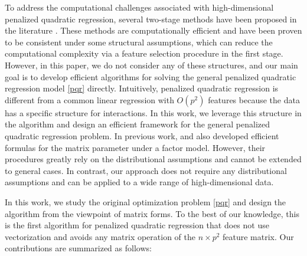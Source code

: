 \documentclass[preprint,authoryear,11pt]{elsarticle}
\begin{document}
To address the computational challenges associated with high-dimensional penalized quadratic regression, several two-stage methods have been proposed in the literature \citep[e.g.,]{hao2014interaction, fan2015innovated, kong2017interaction, hao2016model, yu2019reluctant}. These methods are computationally efficient and have been proven to be consistent under some structural assumptions, which can reduce the computational complexity via a feature selection procedure in the first stage. However, in this paper, we do not consider any of these structures, and our main goal is to develop efficient algorithms for solving the general penalized quadratic regression model \eqref{pqr} directly.
Intuitively, penalized quadratic regression is different from a common linear regression with $O(p^2)$ features because the data has a specific structure for interactions. In this work, we leverage this structure in the algorithm and design an efficient framework for the general penalized quadratic regression problem. In previous work, \cite{wang2021penalized} and \cite{tang2020high} also developed efficient formulas for the matrix parameter under a factor model.  However, their procedures greatly rely on the distributional assumptions and cannot be extended to general cases.
   In contrast, our approach does not require any distributional assumptions and can be applied to a wide range of high-dimensional data.

    
 


In this work, we study the original optimization problem \eqref{pqr} and design the algorithm from the viewpoint of matrix forms. To the best of our knowledge, this is the first algorithm for penalized quadratic regression that does not use vectorization and avoids any matrix operation of the $n \times p^2$ feature matrix. Our contributions are summarized as follows:
\end{document}
